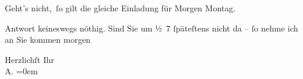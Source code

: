 \pstart
           Geht’s nicht, ſo gilt {\pb}die gleiche Einladung für Morgen Montag.\pend
           
\pstart
           Antwort keineswegs nöthig. Sind Sie um ½ 7{ }ſpäteſtens nicht da –{ }ſo nehme ich an
               Sie kommen morgen\pend
           
\pstart
           Herzlichſt Ihr{\\[\baselineskip]}\spacefill\mbox{A.}\pend
           \leftskip=0em{}\endnumbering{}
\begin{anhang}
\end{anhang}\newcommand{\dateiname}{L04201}\newcommand{\titel}{Arthur Schnitzler an Gustav Schwarzkopf, [25. 10. 1903?]}\newcommand{\editorInnen}{Herausgegeben von Jahnke, SelmaMüller, Martin Anton}

